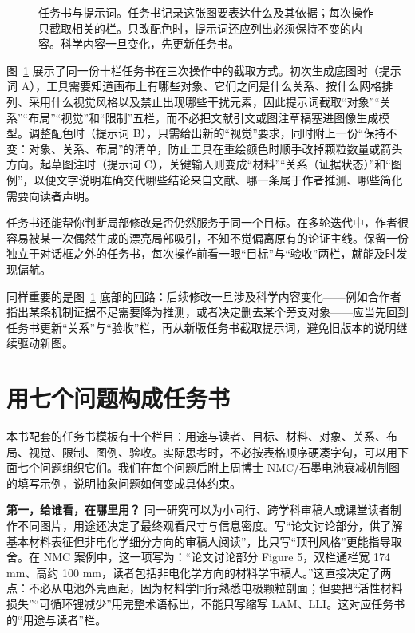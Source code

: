 \begin{figure}[htbp]\centering

\caption{任务书与提示词。任务书记录这张图要表达什么及其依据；每次操作只截取相关的栏。只改配色时，提示词还应列出必须保持不变的内容。科学内容一旦变化，先更新任务书。}\label{fig:ch02-01}
\end{figure}

图~\ref{fig:ch02-01} 展示了同一份十栏任务书在三次操作中的截取方式。初次生成底图时（提示词 A），工具需要知道画布上有哪些对象、它们之间是什么关系、按什么网格排列、采用什么视觉风格以及禁止出现哪些干扰元素，因此提示词截取“对象”“关系”“布局”“视觉”和“限制”五栏，而不必把文献引文或图注草稿塞进图像生成模型。调整配色时（提示词 B），只需给出新的“视觉”要求，同时附上一份“保持不变：对象、关系、布局”的清单，防止工具在重绘颜色时顺手改掉颗粒数量或箭头方向。起草图注时（提示词 C），关键输入则变成“材料”“关系（证据状态）”和“图例”，以便文字说明准确交代哪些结论来自文献、哪一条属于作者推测、哪些简化需要向读者声明。

任务书还能帮你判断局部修改是否仍然服务于同一个目标。在多轮迭代中，作者很容易被某一次偶然生成的漂亮局部吸引，不知不觉偏离原有的论证主线。保留一份独立于对话框之外的任务书，每次操作前看一眼“目标”与“验收”两栏，就能及时发现偏航。

同样重要的是图~\ref{fig:ch02-01} 底部的回路：后续修改一旦涉及科学内容变化——例如合作者指出某条机制证据不足需要降为推测，或者决定删去某个旁支对象——应当先回到任务书更新“关系”与“验收”栏，再从新版任务书截取提示词，避免旧版本的说明继续驱动新图。

\section{用七个问题构成任务书}

本书配套的任务书模板有十个栏目：用途与读者、目标、材料、对象、关系、布局、视觉、限制、图例、验收。实际思考时，不必按表格顺序硬凑字句，可以用下面七个问题组织它们。我们在每个问题后附上周博士 NMC/石墨电池衰减机制图的填写示例，说明抽象问题如何变成具体约束。

\textbf{第一，给谁看，在哪里用？} 同一研究可以为小同行、跨学科审稿人或课堂读者制作不同图片，用途还决定了最终观看尺寸与信息密度。写“论文讨论部分，供了解基本材料表征但非电化学细分方向的审稿人阅读”，比只写“顶刊风格”更能指导取舍。在 NMC 案例中，这一项写为：“论文讨论部分 Figure 5，双栏通栏宽 174 mm、高约 100 mm，读者包括非电化学方向的材料学审稿人。”这直接决定了两点：不必从电池外壳画起，因为材料学同行熟悉电极颗粒剖面；但要把“活性材料损失”“可循环锂减少”用完整术语标出，不能只写缩写 LAM、LLI。这对应任务书的“用途与读者”栏。

